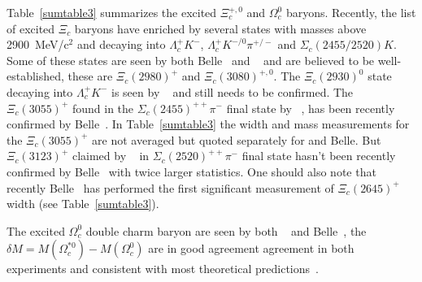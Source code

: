 Table~\ref{sumtable3} summarizes the excited $\Xi_c^{+,0}$ and $\Omega_c^0$ 
baryons. Recently, the list of excited $\Xi_c$ baryons have enriched by 
several states with masses above 2900~MeV/c$^2$ and decaying into 
$\Lambda_c^+ K^-$, $\Lambda_c^+ K^{-/0}\pi^{+/-}$ and $\Sigma_c(2455/2520) K$. 
Some of these states are seen by both Belle~\cite{Chistov:2006zj,YKato:2014} 
and \babar~\cite{Aubert:2007dt} and are believed to be well-established, 
these are $\Xi_c(2980)^+$ and $\Xi_c(3080)^{+,0}$. 
The $\Xi_c(2930)^0$ state decaying into 
$\Lambda_c^+ K^-$ is seen by \babar~\cite{Aubert:2007eb} 
and still needs to be confirmed.  
The $\Xi_c(3055)^+$ found in the $\Sigma_c(2455)^{++}\pi^-$ final state by \babar~\cite{Aubert:2007dt}, 
has been recently confirmed by Belle~\cite{YKato:2014}. 
In Table~\ref{sumtable3} the width and mass measurements for the $\Xi_c(3055)^+$ 
are not averaged but quoted separately for \babar and Belle. 
But $\Xi_c(3123)^+$ claimed by \babar~\cite{Aubert:2007dt} in 
$\Sigma_c(2520)^{++}\pi^-$ final state hasn't been recently
confirmed by Belle~\cite{YKato:2014} with twice larger statistics.   
One should also note that recently Belle~\cite{YKato:2014} 
has performed the first significant measurement of $\Xi_c(2645)^+$ width (see Table~\ref{sumtable3}). 




The excited $\Omega_c^0$ double charm baryon are seen by both 
\babar~\cite{Aubert:2006je} and Belle~\cite{Solovieva:2008fw}, the 
$\delta M=M(\Omega_c^{*0})-M(\Omega_c^0)$ are in good agreement 
agreement in both experiments and consistent with most theoretical 
predictions~\cite{Rosner:1995yu,Glozman:1995xy,Jenkins:1996de,
Burakovsky:1997vm}. 
   

